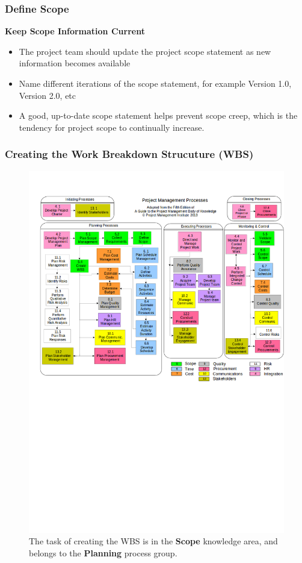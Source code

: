 \documentclass[aspectratio=169]{beamer}
\begin{document}

\begin{frame}
\frametitle{Define Scope}
\textbf{Keep Scope Information Current}
\vspace{0.5cm}
\begin{itemize}
\item The project team should update the project scope statement as new information becomes available
\item Name different iterations of the scope statement, for example Version 1.0, Version 2.0, etc
\item A good, up-to-date scope statement helps prevent scope creep, which is the tendency for project scope to continually increase.
\end{itemize}
\end{frame}


\begin{frame}
\frametitle{Creating the Work Breakdown Strucuture (WBS)}
\vspace{-0.5cm}
\begin{figure}
\caption{The task of creating the WBS is in the \textbf{Scope} knowledge area, and belongs to the \textbf{Planning} process group.}
\vspace{-0.8cm}
\includegraphics[scale=0.3]{mapping}
\end{figure}
\end{frame}
\end{document}
